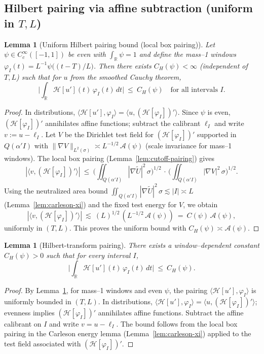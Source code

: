 \documentclass[11pt]{article}
\newtheorem{lemma}[theorem]{Lemma}
\theoremstyle{definition}
\theoremstyle{remark}
\theoremstyle{definition}
\newcommand{\R}{\mathbb{R}}
\begin{document}
\subsection*{Hilbert pairing via affine subtraction (uniform in $T,L$)}
\begin{lemma}[Uniform Hilbert pairing bound (local box pairing)]\label{lem:hilbert-H1BMO}
Let $\psi\in C_c^\infty([-1,1])$ be even with $\int_\R\psi=1$ and define the mass--1 windows $\varphi_I(t)=L^{-1}\psi\big((t-T)/L\big)$. Then there exists $C_H(\psi)<\infty$ (independent of $T,L$) such that for $u$ from the smoothed Cauchy theorem,
\[
  \Big|\int_\R \mathcal H[u'](t)\,\varphi_I(t)\,dt\Big|\ \le\ C_H(\psi)\quad\text{for all intervals }I.
\]
\end{lemma}
\begin{proof}
In distributions, $\langle \mathcal H[u'],\varphi_I\rangle=\langle u,(\mathcal H[\varphi_I])'\rangle$. Since $\psi$ is even, $(\mathcal H[\varphi_I])'$ annihilates affine functions; subtract the calibrant $\ell_I$ and write $v:=u-\ell_I$. Let $V$ be the Dirichlet test field for $(\mathcal H[\varphi_I])'$ supported in $Q(\alpha'I)$ with $\|\nabla V\|_{L^2(\sigma)}\asymp L^{-1/2}\,\mathcal A(\psi)$ (scale invariance for mass--1 windows). The local box pairing (Lemma~\ref{lem:cutoff-pairing}) gives
\[
  |\langle v,(\mathcal H[\varphi_I])'\rangle|\ \le\ \Big(\iint_{Q(\alpha'I)} |\nabla \widetilde U|^2\,\sigma\Big)^{1/2}\,\cdot\,\Big(\iint_{Q(\alpha'I)} |\nabla V|^2\,\sigma\Big)^{1/2}.
\]
Using the neutralized area bound $\iint_{Q(\alpha'I)} |\nabla \widetilde U|^2\,\sigma\lesssim |I|\asymp L$ (Lemma~\ref{lem:carleson-xi}) and the fixed test energy for $V$, we obtain
\[
  |\langle v,(\mathcal H[\varphi_I])'\rangle|\ \lesssim\ (L)^{1/2}\,(L^{-1/2}\,\mathcal A(\psi))\ =\ C(\psi)\,\mathcal A(\psi),
\]
uniformly in $(T,L)$. This proves the uniform bound with $C_H(\psi)\asymp \mathcal A(\psi)$.
\end{proof}
\begin{lemma}[Hilbert-transform pairing]\label{lem:hilbert}
There exists a window–dependent constant \(C_H(\psi)>0\) such that for every interval \(I\),
\[ \Big|\int_{\R} \mathcal H[u'](t)\,\varphi_I(t)\,dt\Big|\ \le\ C_H(\psi).\]
\end{lemma}
\begin{proof}
By Lemma~\ref{lem:hilbert-H1BMO}, for mass–1 windows and even \(\psi\), the pairing \(\langle \mathcal H[u'],\varphi_I\rangle\) is uniformly bounded in \((T,L)\). In distributions, \(\langle \mathcal H[u'],\varphi_I\rangle=\langle u,(\mathcal H[\varphi_I])'\rangle\); evenness implies \((\mathcal H[\varphi_I])'\) annihilates affine functions. Subtract the affine calibrant on \(I\) and write \(v=u-\ell_I\). The bound follows from the local box pairing in the Carleson energy lemma (Lemma~\ref{lem:carleson-xi}) applied to the test field associated with \((\mathcal H[\varphi_I])'\).
\end{proof}
\end{document}
